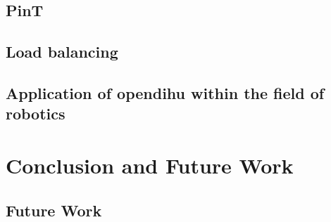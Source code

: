 \section{PinT}
\section{Load balancing}
\section{Application of opendihu within the field of robotics}

\chapter{Conclusion and Future Work}\label{sec:conclusion_and_future_work}

\section{Future Work}\label{sec:future_work}
 

\fi




